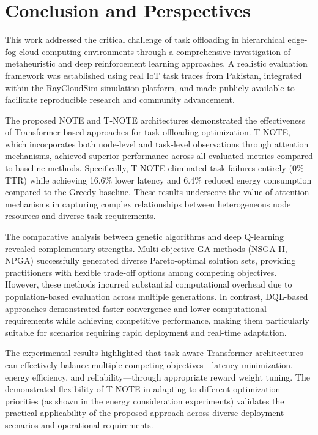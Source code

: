 \documentclass[preprint,3p,authoryear]{elsarticle}
\begin{document}


\section{Conclusion and Perspectives}\label{sec:conclusion}

This work addressed the critical challenge of task offloading in hierarchical edge-fog-cloud computing environments through a comprehensive investigation of metaheuristic and deep reinforcement learning approaches. A realistic evaluation framework was established using real IoT task traces from Pakistan, integrated within the RayCloudSim simulation platform, and made publicly available to facilitate reproducible research and community advancement.

The proposed NOTE and T-NOTE architectures demonstrated the effectiveness of Transformer-based approaches for task offloading optimization. T-NOTE, which incorporates both node-level and task-level observations through attention mechanisms, achieved superior performance across all evaluated metrics compared to baseline methods. Specifically, T-NOTE eliminated task failures entirely (0\% TTR) while achieving 16.6\% lower latency and 6.4\% reduced energy consumption compared to the Greedy baseline. These results underscore the value of attention mechanisms in capturing complex relationships between heterogeneous node resources and diverse task requirements.

The comparative analysis between genetic algorithms and deep Q-learning revealed complementary strengths. Multi-objective GA methods (NSGA-II, NPGA) successfully generated diverse Pareto-optimal solution sets, providing practitioners with flexible trade-off options among competing objectives. However, these methods incurred substantial computational overhead due to population-based evaluation across multiple generations. In contrast, DQL-based approaches demonstrated faster convergence and lower computational requirements while achieving competitive performance, making them particularly suitable for scenarios requiring rapid deployment and real-time adaptation.

The experimental results highlighted that task-aware Transformer architectures can effectively balance multiple competing objectives—latency minimization, energy efficiency, and reliability—through appropriate reward weight tuning. The demonstrated flexibility of T-NOTE in adapting to different optimization priorities (as shown in the energy consideration experiments) validates the practical applicability of the proposed approach across diverse deployment scenarios and operational requirements.
\end{document}
